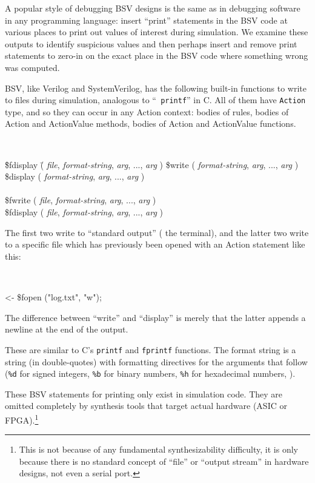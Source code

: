 
A popular style of debugging BSV designs is the same as in debugging
software in any programming language: insert ``print'' statements in
the BSV code at various places to print out values of interest during
simulation.  We examine these outputs to identify suspicious values
and then perhaps insert and remove print statements to zero-in on the
exact place in the BSV code where something wrong was computed.

BSV, like Verilog and SystemVerilog, has the following built-in
functions to write to files during simulation, analogous to ``{\tt
printf}'' in C. All of them have {\tt Action} type, and so they can
occur in any Action context: bodies of rules, bodies of Action and
ActionValue methods, bodies of Action and ActionValue functions.

{\tt
\begin{tabbing}
\hmmm\= \$fdisplay \= ( {\it file}, \= {\it format-string}, {\it arg}, ..., {\it arg} ) \kill
     \> \$write    \> (             \> {\it format-string}, {\it arg}, ..., {\it arg} ) \\
     \> \$display  \> (             \> {\it format-string}, {\it arg}, ..., {\it arg} ) \\
\\
     \> \$fwrite   \> ( {\it file}, \> {\it format-string}, {\it arg}, ..., {\it arg} ) \\
     \> \$fdisplay \> ( {\it file}, \= {\it format-string}, {\it arg}, ..., {\it arg} )
\end{tabbing}
}

The first two write to ``standard output'' ({\ie} the terminal), and
the latter two write to a specific file which has previously been
opened with an Action statement like this:

{\tt
\begin{tabbing}
 <- \$fopen ("log.txt", "w");
\end{tabbing}
}

The difference between ``write'' and ``display'' is merely that the
latter appends a newline at the end of the output.

These are similar to C's \verb|printf| and \verb|fprintf| functions.
The format string is a string (in double-quotes) with formatting
directives for the arguments that follow (\verb|%d| for signed
integers, \verb|%b| for binary numbers, \verb|%h| for hexadecimal
numbers, {\etc}).

These BSV statements for printing only exist in simulation code.  They
are omitted completely by synthesis tools that target actual hardware
(ASIC or FPGA).\footnote{This is not because of any fundamental
synthesizability difficulty, it is only because there is no standard
concept of ``file'' or ``output stream'' in hardware designs, not even
a serial port.}

